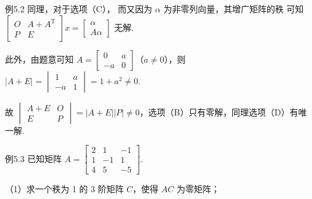 \begin{fcard}{例5.2}
同理，对于选项（C），
而又因为 $\alpha$ 为非零列向量，其增广矩阵的秩
可知 $\begin{bmatrix}O&A+A^{\mathrm T}\\P&E\end{bmatrix}x=\begin{bmatrix}\alpha\\A\alpha\end{bmatrix}$ 无解.

此外，由题意可知 $A=\begin{bmatrix}0&a\\-a&0\end{bmatrix}$（$a\ne0$），则 $|A+E|=\begin{vmatrix}1&a\\-a&1\end{vmatrix}=1+a^2\ne0$.

故 $\begin{vmatrix}A+E&O\\E&P\end{vmatrix}=|A+E||P|\ne0$，选项（B）只有零解，同理选项（D）有唯一解.
\end{fcard}

\begin{fcard}{例5.3}
已知矩阵 $A=\begin{bmatrix}2&1&-1\\1&-1&1\\4&5&-5\end{bmatrix}$.

（1）求一个秩为 1 的 3 阶矩阵 $C$，使得 $AC$ 为零矩阵；

\end{fcard}
